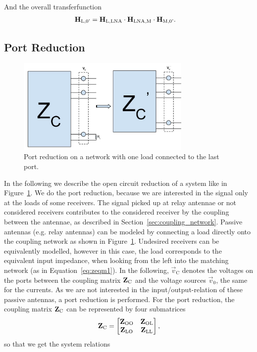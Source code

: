 And the overall transferfunction
\begin{align}
\label{eq:transf_func}
\mathbf{H}_\text{L,0'} &= \mathbf{H}_\text{L,LNA}\cdot\mathbf{H}_\text{LNA,M}\cdot\mathbf{H}_\text{M,0'}.
\end{align}

\subsection{Port Reduction}
\label{sec:port_reduction}

\begin{figure}
\begin{center}
\includegraphics[width=0.75\textwidth]{images/Port_reduction.jpg}
\caption{Port reduction on a network with one load connected to the last port.}
\label{fig:port_reduction}
\end{center}
\end{figure}
In the following we describe the open circuit reduction of a system like in Figure~\ref{fig:port_reduction}.
We do the port reduction, because we are interested in the signal only at the loads of some receivers.
The signal picked up at relay antennae or not considered receivers contributes to the considered receiver by the coupling between the antennae, as described in Section~\ref{sec:coupling_network}.
Passive antennas (e.g. relay antennas) can be modeled by connecting a load directly onto the coupling network as shown in Figure~\ref{fig:port_reduction}.
Undesired receivers can be equivalently modelled, however in this case, the load corresponds to the equivalent input impedance, when looking from the left into the matching network (as in Equation~\eqref{eq:zeqm1}).
In the following, $\vec{v}_\text{C}$ denotes the voltages on the ports between the coupling matrix $\mathbf{Z}_\text{C}$ and the voltage sources $\vec{v}_0$, the same for the currents.
As we are not interested in the input/output-relation of these passive antennas, a port reduction is performed.
For the port reduction, the coupling matrix $\mathbf{Z}_\text{C}$ can be represented by four submatrices
\begin{equation}
\mathbf{Z}_\text{C}=
\begin{bmatrix}
\mathbf{Z}_\text{OO} & \mathbf{Z}_\text{OL}\\
\mathbf{Z}_\text{LO} & \mathbf{Z}_\text{LL}
\end{bmatrix},
\end{equation}
so that we get the system relations

